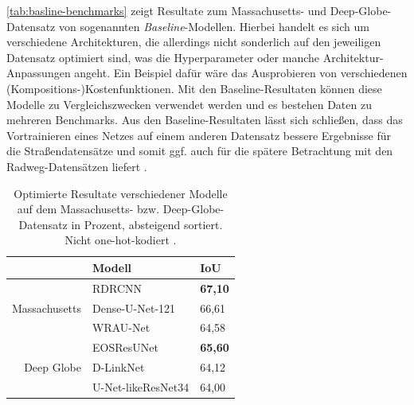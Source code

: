 \autoref{tab:basline-benchmarks} zeigt Resultate zum Massachusetts- und Deep-Globe-Datensatz von sogenannten \textit{Baseline}-Modellen.
Hierbei handelt es sich um verschiedene Architekturen, die allerdings nicht sonderlich auf den jeweiligen Datensatz optimiert sind,
was die Hyperparameter oder manche Architektur-Anpassungen angeht. Ein Beispiel dafür wäre das Ausprobieren von verschiedenen (Kompositions-)Kostenfunktionen. 
Mit den Baseline-Resultaten können diese Modelle zu Vergleichszwecken verwendet werden 
und es bestehen Daten zu mehreren Benchmarks. Aus den Baseline-Resultaten lässt sich schließen, dass das Vortrainieren eines Netzes auf einem 
anderen Datensatz bessere Ergebnisse für die Straßendatensätze und somit ggf. auch für die spätere Betrachtung mit 
den Radweg-Datensätzen liefert \cite{C.Henry.2021}.

\newcommand*\rot{\rotatebox{60}}

\begin{table}
	\centering
	\begin{tabular}{r|l|l}
		& Modell & IoU \\
		\midrule
		& RDRCNN & \textbf{67,10} \\
		Massachusetts & Dense-U-Net-121 & 66,61  \\
		& WRAU-Net & 64,58 \\
		\midrule
		& EOSResUNet & \textbf{65,60} \\
		Deep Globe & D-LinkNet & 64,12 \\
		& U-Net-likeResNet34 & 64,00 \\
	\end{tabular}
	\caption{Optimierte Resultate verschiedener Modelle auf dem Massachusetts- 
	bzw. Deep-Globe-Datensatz in Prozent, absteigend sortiert. Nicht one-hot-kodiert \cite{C.Henry.2021}.}
	\label{tab:optimized-benchmarks}
\end{table}


